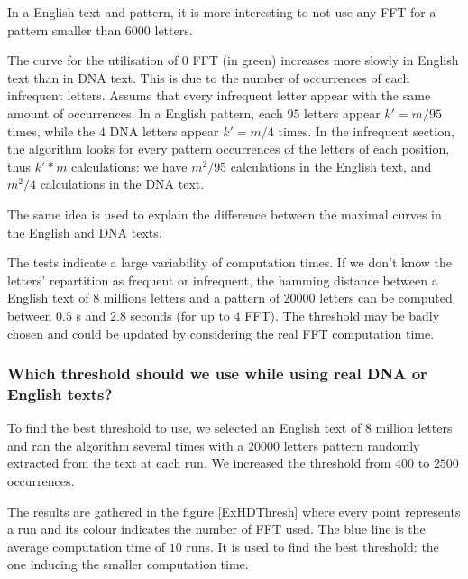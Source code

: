 \documentclass[preprint,12pt]{elsarticle}
\begin{document}
In a English text and pattern, it is more interesting to not use any FFT for a pattern smaller than $6000$ letters.

The curve for the utilisation of $0$ FFT (in green) increases more slowly in English text
than in DNA text.
This is due to the number of occurrences of each infrequent letters.
Assume that every infrequent letter appear with the same amount of occurrences.
In a English pattern, each $95$ letters appear $k'=m/95$ times,
while the $4$ DNA letters appear $k'=m/4$ times.
In the infrequent section, the algorithm looks for every pattern occurrences of the letters of each position,
thus $k'*m$ calculations:
we have $m^2/95$ calculations in the English text,
and $m^2/4$ calculations in the DNA text. 

The same idea is used to explain the difference between the maximal curves in the English and DNA texts.


The tests indicate a large variability of computation times.
If we don't know the letters' repartition as frequent or infrequent,
the hamming distance between a English text of $8$ millions letters
and a pattern of $20 000$ letters can be computed between $0.5$ s and $2.8$ seconds
(for up to $4$ FFT).
The threshold may be badly chosen and could be updated by considering the real FFT computation time.




\subsubsection*{Which threshold should we use while using real DNA or English texts?}

To find the best threshold to use,
we selected an English text of $8$ million letters
and ran the algorithm several times
with a $20 000$ letters pattern
randomly extracted from the text at each run.
We increased the threshold from $400$ to $2500$ occurrences.%

The results are gathered in the figure \ref{ExHDThresh} where
every point represents a run and its colour indicates the number of FFT used.
The blue line is the average computation time of $10$ runs.
It is used to find the best threshold:
the one inducing the smaller computation time.
\end{document}
